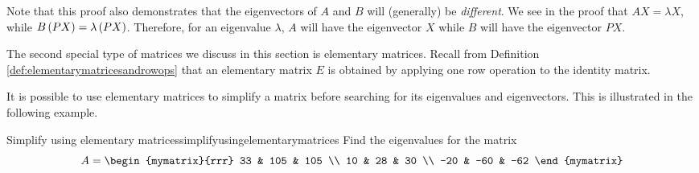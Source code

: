 Note that this proof also demonstrates that the eigenvectors of $A$ and $B$ will (generally) be {\em different\em}.
We see in the proof that $AX = \lambda X$, while $B \left(PX\right)=\lambda \left(PX\right)$. Therefore,
for an eigenvalue $\lambda$, $A$ will have the eigenvector $X$ while $B$ will have the eigenvector $PX$. 


The second special type of matrices we discuss in this section is elementary matrices.  
Recall from Definition \ref{def:elementarymatricesandrowops} that an elementary matrix $E$ is obtained by applying
one row operation to the identity matrix. 

It is possible to use elementary matrices to simplify a matrix before searching for its
eigenvalues and eigenvectors. This is illustrated in the following
example.

\begin{example}{Simplify using elementary matrices}{simplifyusingelementarymatrices}
Find the eigenvalues for the matrix
\begin{equation*}
A = \begin{mymatrix}{rrr}
 33 & 105 & 105 \\
 10 &  28 & 30 \\
-20 & -60 & -62
\end{mymatrix}
\end{equation*}
\end{example}

